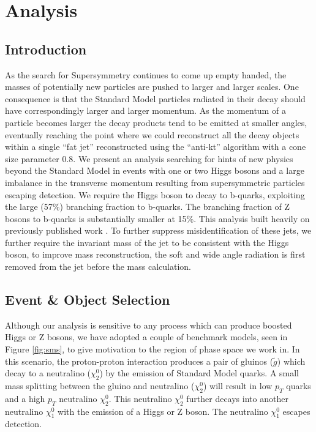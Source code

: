 \chapter{Analysis}
\label{chap:analysis}

\section{Introduction}

As the search for Supersymmetry continues to come up empty handed, the masses of potentially new particles are pushed to larger and larger scales. One consequence is that the Standard Model particles radiated in their decay should have correspondingly larger and larger momentum. As the momentum of a particle becomes larger the decay products tend to be emitted at smaller angles, eventually reaching the point where we could reconstruct all the decay objects within a single ``fat jet'' reconstructed using the ``anti-kt'' algorithm with a cone size parameter 0.8. We present an analysis searching for hints of new physics beyond the Standard Model in events with one or two Higgs bosons and a large imbalance in the transverse momentum resulting from supersymmetric particles escaping detection. We require the Higgs boson to decay to b-quarks, exploiting the large (57\%) branching fraction to b-quarks. The branching fraction of Z bosons to b-quarks is substantially smaller at 15\%. This analysis built heavily on previously published work \cite{CMS-SUS-16-033} \cite{CMS-SUS-15-002}. To further suppress misidentification of these jets, we further require the invariant mass of the jet to be consistent with the Higgs boson, to improve mass reconstruction, the soft and wide angle radiation is first removed from the jet before the mass calculation.

\section{Event \& Object Selection}

Although our analysis is sensitive to any process which can produce boosted Higgs or Z bosons, we have adopted a couple of benchmark models, seen in Figure \ref{fig:sms}, to give motivation to the region of phase space we work in. In this scenario, the proton-proton interaction produces a pair of gluinos ($\tilde{g}$) which decay to a neutralino ($\chi_{2}^{0}$) by the emission of Standard Model quarks. A small mass splitting between the gluino and neutralino ($\chi_{2}^{0}$) will result in low $p_{T}$ quarks and a high $p_{T}$ neutralino $\chi_{2}^{0}$. This neutralino $\chi_{2}^{0}$ further decays into another neutralino $\chi_{1}^{0}$ with the emission of a Higgs or Z boson. The neutralino $\chi_{1}^{0}$ escapes detection.

